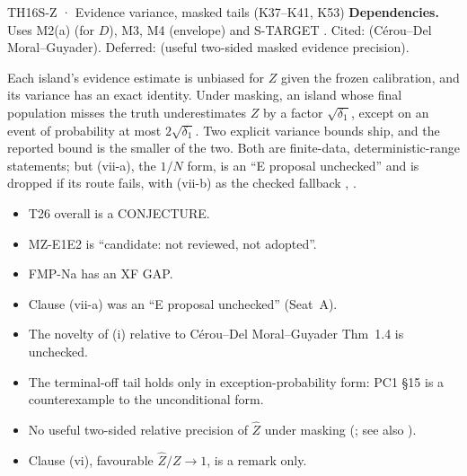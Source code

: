 \begin{card}{TH16}{S-Z · Evidence variance, masked tails (K37–K41, K53)}
\textbf{Dependencies.} Uses M2(a) (for $D$), M3, M4 (envelope) and S-TARGET  . Cited:  (Cérou--Del Moral--Guyader). Deferred:  (useful two-sided masked evidence precision).

\begin{plain}
Each island's evidence estimate is unbiased for $Z$ given the frozen calibration, and its variance has an exact identity. Under masking, an island whose final population misses the truth underestimates $Z$ by a factor $\sqrt{\delta_1}$, except on an event of probability at most $2\sqrt{\delta_1}$. Two explicit variance bounds ship, and the reported bound is the smaller of the two. Both are finite-data, deterministic-range statements; but (vii-a), the $1/N$ form, is an ``E proposal unchecked'' and is dropped if its route fails, with (vii-b) as the checked fallback , .
\end{plain}
\begin{notproved}
\begin{itemize}
\item T26 overall is a CONJECTURE.
\item MZ-E1E2 is ``candidate: not reviewed, not adopted''.
\item FMP-Na has an XF GAP.
\item Clause (vii-a) was an ``E proposal unchecked'' (Seat~A).
\item The novelty of (i) relative to Cérou--Del Moral--Guyader Thm~1.4 is unchecked.
\item The terminal-off tail holds only in exception-probability form: PC1 §15 is a counterexample to the unconditional form.
\item No useful two-sided relative precision of $\hat{Z}$ under masking (; see also ).
\item Clause (vi), favourable $\hat{Z}/Z\to1$, is a remark only.
\end{itemize}
\end{notproved}
\end{card}

